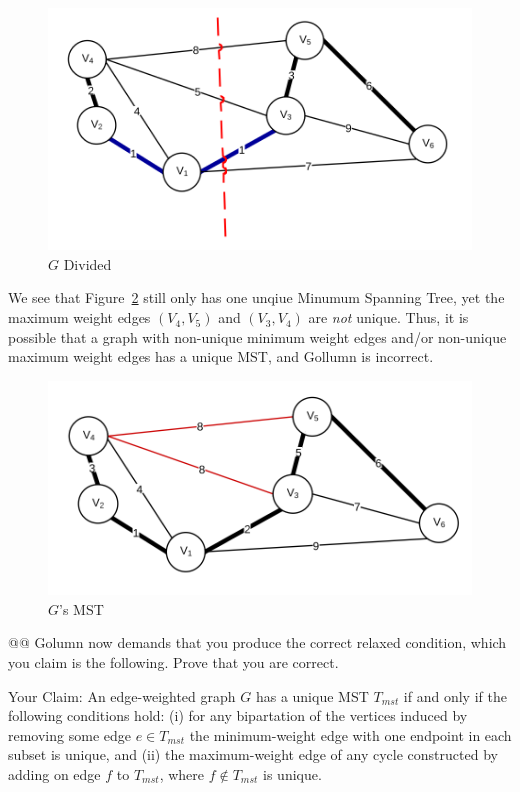 \documentclass[10pt]{article}\usepackage[]{graphicx}\usepackage[]{xcolor}
\begin{document}
\begin{easylist}[enumerate]
    \begin{figure}[H]
        \centering
        \includegraphics[scale=0.5]{./img/ps8/3b1.png}
        \caption{$G$ Divided}
        \label{fig:3ba}
    \end{figure}

    We see that Figure~\ref{fig:3bb} still only has one unqiue Minumum Spanning Tree, yet the maximum weight edges
    $(V_4, V_5)$ and $(V_3, V_4)$ are \textit{not} unique. Thus, it is possible that a graph with non-unique minimum
    weight edges and/or non-unique maximum weight edges has a unique MST, and Gollumn is incorrect.

    \begin{figure}[H]
        \centering
        \includegraphics[scale=0.5]{./img/ps8/3b2.png}
        \caption{$G$'s MST}
        \label{fig:3bb}
    \end{figure}

    @@ Golumn now demands that you produce the correct relaxed condition, which you claim is the following. Prove that
    you are correct.

    Your Claim: An edge-weighted graph $G$ has a unique MST $T_{mst}$ if and only if the following conditions hold:
    (i) for any bipartation of the vertices induced by removing some edge $e \in T_{mst}$ the minimum-weight edge with
    one endpoint in each subset is unique, and
    (ii) the maximum-weight edge of any cycle constructed by adding on edge $f$ to $T_{mst}$, where $f \not\in T_{mst}$
    is unique.


\end{easylist}
\end{document}
